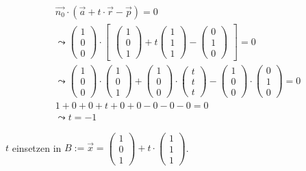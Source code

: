 \begin{gather}
\vec{n_0} \cdot (\vec{a}+t\cdot \vec{r}-\vec{p})=0\\
\leadsto 
\begin{pmatrix}
1\\0\\0
\end{pmatrix} \cdot 
\begin{bmatrix}
\begin{pmatrix}
1\\0\\1
\end{pmatrix}
+ t
\begin{pmatrix}
1\\1\\1
\end{pmatrix}
-
\begin{pmatrix}
0\\1\\0
\end{pmatrix}
\end{bmatrix} = 0\\
\leadsto
\begin{pmatrix}
1\\0\\0
\end{pmatrix}\cdot
\begin{pmatrix}
1\\0\\1
\end{pmatrix}
+
\begin{pmatrix}
1\\0\\0
\end{pmatrix}
\cdot
\begin{pmatrix}
t\\t\\t
\end{pmatrix}
-
\begin{pmatrix}
1\\0\\0
\end{pmatrix}
\cdot
\begin{pmatrix}
0\\1\\0
\end{pmatrix} =0\\
1+0+0+t+0+0-0-0-0=0\\
\leadsto t=-1
\end{gather}

\ensuremath{t} einsetzen in \ensuremath{B:= \vec{x}=\begin{pmatrix}
		1\\0\\1
	\end{pmatrix} +t\cdot\begin{pmatrix}
		1\\1\\1
\end{pmatrix}}.\\

